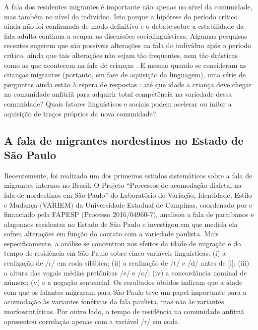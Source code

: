 \documentclass[
	a4paper,	%
	12pt,		%
	]{article}	%
\begin{document}
	A fala dos residentes migrantes é importante não apenas no nível da comunidade, mas também no
	nível do indivíduo. Isto porque a hipótese do período crítico \citep{Lenneberg1967} ainda não
	foi confirmada de modo definitivo e o debate sobre a estabilidade da fala adulta continua a
	ocupar as discussões sociolinguísticas. Algumas pesquisas recentes sugerem que são possíveis
	alterações na fala do indivíduo após o período crítico, ainda que tais alterações não sejam tão
	frequentes, nem tão drásticas como as que acontecem na fala de crianças
	\citep{Cukor-Avila.Bailey2013}. E mesmo quando se consideram as crianças migrantes (portanto, em
	fase de aquisição da linguagem), uma série de perguntas ainda estão à espera de respostas
	\citep{Oushiro2016, Nycz2015, Chambers1992, Trudgill1986}: até que idade a criança deve chegar
	na comunidade anfitriã para adquirir total competência na variedade dessa comunidade? Quais
	fatores linguísticos e sociais podem acelerar ou inibir a aquisição de traços próprios da nova
	comunidade?

	\subsection{A fala de migrantes nordestinos no Estado de São Paulo} \label{estudos-sp}

	Recentemente, foi realizado um dos primeiros estudos sistemáticos sobre a fala de migrantes
	internos no Brasil. O Projeto \enquote{Processos de acomodação dialetal na fala de nordestinos
	em São Paulo} do Laboratório de Variação, Identidade, Estilo e Mudança (VARIEM) da Universidade
	Estadual de Campinas, coordenado por \citet{Oushiro2018} e financiado pela FAPESP (Processo
	2016/04960-7), analisou a fala de paraibanos e alagoanos residentes no Estado de São Paulo e
	investigou em que medida ela sofreu alterações em função do contato com a variedade paulista.
	Mais especificamente, a análise se concentrou nos efeitos da idade de migração e do tempo de
	residência em São Paulo sobre cinco variáveis linguísticas: (i) a realização de /r/ em coda
	silábica; (ii) a realização de /t/ e /d/ antes de [i]; (iii) a altura das vogais médias
	pretônicas /e/ e /o/; (iv) a concordância nominal de número; (v) e a negação sentencial. Os
	resultados obtidos indicam que a idade com que os falantes migraram para São Paulo teve um papel
	importante para a acomodação às variantes fonéticas da fala paulista, mas não às variantes
	morfossintáticas. Por outro lado, o tempo de residência na comunidade anfitriã apresentou
	correlação apenas com a variável /r/ em coda.
\end{document}
